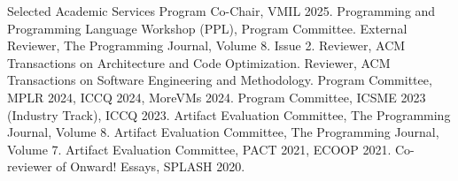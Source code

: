 \begin{rubric}{Selected Academic Services}
  \entry*[2025] Program Co-Chair, VMIL 2025.
  \entry*[2025] Programming and Programming Language Workshop (PPL), Program Committee.
  \entry*[2024] External Reviewer, The Programming Journal, Volume 8. Issue 2.
  \entry*[2024] Reviewer, ACM Transactions on Architecture and Code Optimization.
  \entry*[2024] Reviewer, ACM Transactions on Software Engineering and Methodology.
  \entry*[2024] Program Committee, MPLR 2024, ICCQ 2024, MoreVMs 2024.
  \entry*[2023] Program Committee, ICSME 2023 (Industry Track), ICCQ 2023.
  \entry*[2023] Artifact Evaluation Committee, The Programming Journal, Volume 8.
  \entry*[2022] Artifact Evaluation Committee, The Programming Journal, Volume 7.
  \entry*[2021] Artifact Evaluation Committee, PACT 2021, ECOOP 2021.
  \entry*[2020] Co-reviewer of Onward! Essays, SPLASH 2020.
\end{rubric}
